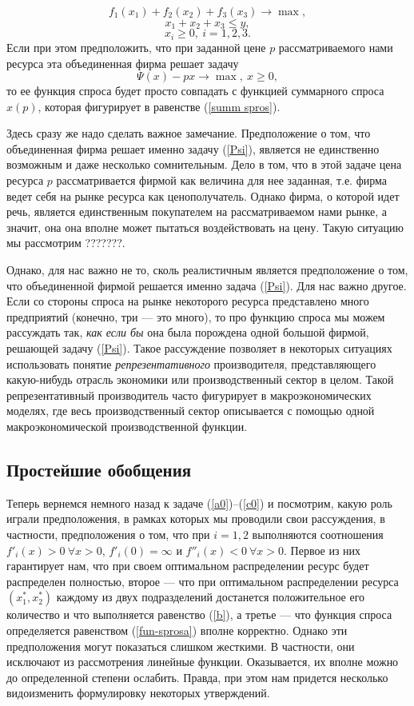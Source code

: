   \[f_{1}(x_{1})+f_{2}(x_{2})+f_{3}(x_{3})\rightarrow\max,\]
   \[ x_{1}+x_{2}+x_{3}\leqslant y,\]
    \[x_{i}\geqslant0,\ i=1,2,3.\]
   Если при этом предположить, что при заданной цене $p$ рассматриваемого
   нами ресурса эта объединенная фирма решает задачу
\begin{equation}
\label{Psi}
   \Psi(x)-px\rightarrow\max,\ x\geqslant0,
\end{equation}
   то ее функция спроса будет просто совпадать с функцией суммарного
   спроса $x(p)$, которая фигурирует в равенстве
   (\ref{summ spros}).

   Здесь сразу же надо сделать важное замечание.
   Предположение о том, что объединенная фирма решает
   именно задачу (\ref{Psi}), является не единственно возможным и
   даже несколько сомнительным. Дело в том, что в этой задаче цена
   ресурса $p$ рассматривается фирмой как величина для нее заданная,
    т.е. фирма ведет себя на рынке ресурса как ценополучатель.
   Однако фирма, о которой идет речь, является единственным
   покупателем на рассматриваемом нами рынке, а значит, она она
   вполне может пытаться воздействовать на цену. Такую ситуацию мы
   рассмотрим  ???????.

   Однако, для нас важно не то,
   сколь реалистичным является предположение о том, что объединенной фирмой
   решается именно задача (\ref{Psi}). Для нас важно другое. Если
   со стороны спроса на рынке некоторого ресурса представлено много
   предприятий (конечно, три --- это много), то про функцию спроса
   мы можем рассуждать так, \emph{как если бы} она была порождена одной большой
   фирмой, решающей задачу (\ref{Psi}). Такое рассуждение позволяет
   в некоторых ситуациях использовать понятие \emph{репрезентативного}
   производителя, представляющего какую-нибудь отрасль экономики или
   производственный сектор в целом. Такой репрезентативный
   производитель часто фигурирует в макроэкономических моделях, где
   весь производственный сектор описывается с помощью одной
   макроэкономической производственной функции.


    \subsection{Простейшие обобщения}
   Теперь вернемся немного назад к задаче (\ref{a0})--(\ref{c0}) и
   посмотрим, какую роль играли предположения, в рамках
   которых мы проводили свои рассуждения, в частности, предположения о том, что
   при $i=1,2$ выполняются соотношения $f'_{i}(x)>0 \ \forall x>0$, $f'_{i}(0)=\infty$ и
   $f''_{i}(x)<0 \ \forall x>0$. Первое из них гарантирует нам, что при своем оптимальном
   распределении ресурс будет распределен полностью, второе --- что
   при оптимальном распределении ресурса $(x_{1}^{*},x_{2}^{*})$
   каждому из двух подразделений достанется положительное
   его количество и что выполняется
   равенство (\ref{b}), а третье --- что функция спроса определяется равенством
   (\ref{fun-sprosa}) вполне корректно. Однако эти предположения могут
   показаться слишком жесткими. В частности, они исключают из рассмотрения
   линейные функции. Оказывается, их вполне можно до определенной степени ослабить.
   Правда, при этом нам придется несколько видоизменить формулировку
   некоторых утверждений.

